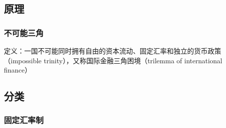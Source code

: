 \documentclass[12pt]{book}
\begin{document}
\subsection{原理}

\subsubsection{不可能三角}

定义：一国不可能同时拥有自由的资本流动、固定汇率和独立的货币政策（impossible trinity），又称国际金融三角困境（trilemma of international finance）





\subsection{分类}

\subsubsection{固定汇率制}
\end{document}
